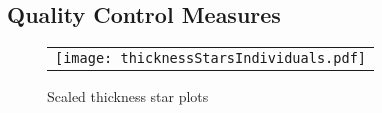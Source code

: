 \subsection{Quality Control Measures}
\begin{figure}
  \centering
  \begin{tabular}{c}
  \texttt{[image: thicknessStarsIndividuals.pdf]} 
  \end{tabular}
  \caption{Scaled thickness star plots
  }
  \label{fig:stars}
\end{figure}






